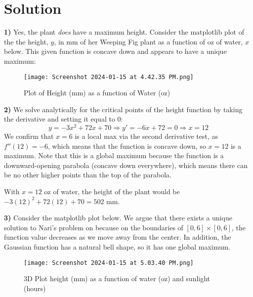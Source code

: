 \documentclass{harvardml}
\theoremstyle{definition}
\theoremstyle{plain}
\newenvironment{solution}
  {\color{blue}\section*{Solution}}
{}
\begin{document}
\begin{solution}
	\textbf{1) } Yes, the plant \textit{does} have a maximum height. Consider the matplotlib plot of the the height, $y$, in mm of her Weeping Fig plant as a function of oz of water, $x$ below. This given function is concave down and appears to have a unique maximum:

 \begin{figure}[H]
     \centering
     \texttt{[image: Screenshot 2024-01-15 at 4.42.35 PM.png]}
     \caption{Plot of Height (mm) as a function of Water (oz) }
     \label{fig:enter-label}
 \end{figure}


 \textbf{2) } We solve analytically for the critical points of the height function by taking the derivative and setting it equal to 0:
$$
y = -3x^{2} + 72x + 70 \Rightarrow y' = -6x + 72 = 0 \Rightarrow x = 12
$$
We confirm that $x = 6$ is a local max via the second derivative test, as $f''(12) = -6$, which means that the function is concave down, so $x = 12$ is a maximum. Note that this is a global maximum because the function is a downward-opening parabola (concave down everywhere), which means there can be no other higher points than the top of the parabola.

With $x = 12$ oz of water, the height of the plant would be $-3(12)^{2} + 72(12) + 70 = 502$ mm. 

\textbf{3) } Consider the matplotlib plot below. We argue that there exists a unique solution to Nari’s problem on because on the boundaries of $[0,6] \times [0,6]$, the function value decreases as we move away from the center. In addition, the Gaussian function has a natural bell shape, so it has one global maximum. 
\begin{figure}[H]
    \centering
    \texttt{[image: Screenshot 2024-01-15 at 5.03.40 PM.png]}
    \caption{3D Plot height (mm) as a function of water (oz) and sunlight (hours)}
    \label{fig:enter-label}
\end{figure}
\end{solution}

\color{black}
\end{document}
